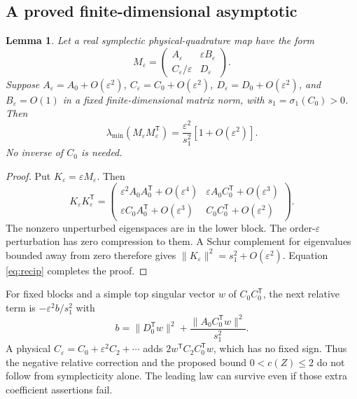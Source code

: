 \documentclass[11pt,a4paper]{article}
\newcommand{\eps}{\varepsilon}
\newtheorem{lemma}{Lemma}
\begin{document}
\subsection{A proved finite-dimensional asymptotic}

\begin{lemma}\label{lem:strong}
Let a real symplectic physical-quadrature map have the form
\begin{equation}\label{eq:strongblock}
M_\eps=\begin{pmatrix}A_\eps&\eps B_\eps\\C_\eps/\eps&D_\eps\end{pmatrix}.
\end{equation}
Suppose $A_\eps=A_0+O(\eps^2)$, $C_\eps=C_0+O(\eps^2)$, $D_\eps=D_0+O(\eps^2)$, and $B_\eps=O(1)$ in a fixed finite-dimensional matrix norm, with $s_1=\sigma_1(C_0)>0$. Then
\begin{equation}\label{eq:stronglaw}
\boxed{\lambda_{\min}(M_\eps M_\eps^{\mathsf T})
=\frac{\eps^2}{s_1^2}[1+O(\eps^2)].}
\end{equation}
No inverse of $C_0$ is needed.
\end{lemma}
\begin{proof}
Put $K_\eps=\eps M_\eps$. Then
\begin{equation}
K_\eps K_\eps^{\mathsf T}=\begin{pmatrix}
\eps^2 A_0A_0^{\mathsf T}+O(\eps^4)&\eps A_0C_0^{\mathsf T}+O(\eps^3)\\
\eps C_0A_0^{\mathsf T}+O(\eps^3)&C_0C_0^{\mathsf T}+O(\eps^2)
\end{pmatrix}.
\end{equation}
The nonzero unperturbed eigenspaces are in the lower block. The order-$\eps$ perturbation has zero compression to them. A Schur complement for eigenvalues bounded away from zero therefore gives $\|K_\eps\|^2=s_1^2+O(\eps^2)$. Equation \eqref{eq:recip} completes the proof.
\end{proof}
For fixed blocks and a simple top singular vector $w$ of $C_0C_0^{\mathsf T}$, the next relative term is $-\eps^2 b/s_1^2$ with
\begin{equation}
b=\|D_0^{\mathsf T}w\|^2+\frac{\|A_0C_0^{\mathsf T}w\|^2}{s_1^2}.
\end{equation}
A physical $C_\eps=C_0+\eps^2C_2+\cdots$ adds $2w^{\mathsf T}C_2C_0^{\mathsf T}w$, which has no fixed sign. Thus the negative relative correction and the proposed bound $0<c(Z)\le2$ do not follow from symplecticity alone. The leading law can survive even if those extra coefficient assertions fail.
\end{document}
